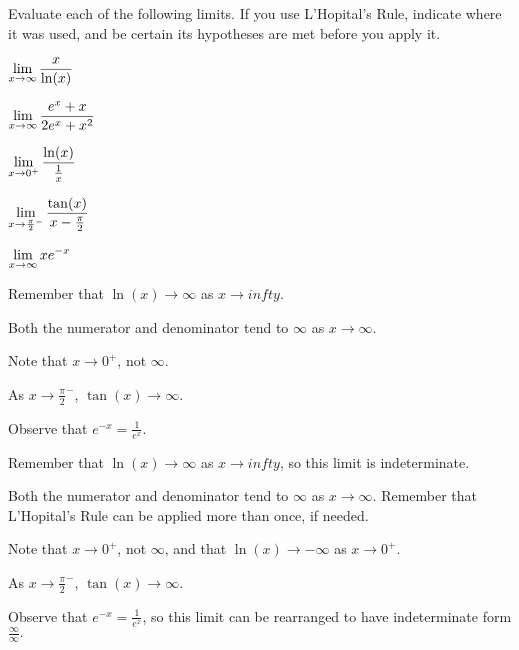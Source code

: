 \begin{activity} \label{A:2.8.3}  
Evaluate each of the following limits.  If you use L'Hopital's Rule, indicate where it was used, and be certain its hypotheses are met before you apply it.
\ba
  \item $\displaystyle \lim_{x \to \infty} \frac{x}{\ln(x)}$  
  \item $\displaystyle \lim_{x \to \infty} \frac{e^{x} + x}{2e^{x} + x^2}$ 
  \item $\displaystyle \lim_{x \to 0^+} \frac{\ln(x)}{\frac{1}{x}}$  
  \item $\displaystyle \lim_{x \to \frac{\pi}{2}^-} \frac{\tan(x)}{x-\frac{\pi}{2}}$
  \item $\displaystyle \lim_{x \to \infty} xe^{-x}$
\ea
\end{activity}
\begin{smallhint}
\ba
	\item Remember that $\ln(x) \to \infty$ as $x \to infty$.
	\item Both the numerator and denominator tend to $\infty$ as $x \to \infty$.
	\item Note that $x \to 0^+$, not $\infty$.
	\item As $x \to \frac{\pi}{2}^-$, $\tan(x) \to \infty$.
	\item Observe that $e^{-x} = \frac{1}{e^x}$.
\ea
\end{smallhint}
\begin{bighint}
\ba
	\item Remember that $\ln(x) \to \infty$ as $x \to infty$, so this limit is indeterminate.
	\item Both the numerator and denominator tend to $\infty$ as $x \to \infty$.  Remember that L'Hopital's Rule can be applied more than once, if needed.
	\item Note that $x \to 0^+$, not $\infty$, and that $\ln(x) \to -\infty$ as $x \to 0^+$.
	\item As $x \to \frac{\pi}{2}^-$, $\tan(x) \to \infty$.  
	\item Observe that $e^{-x} = \frac{1}{e^x}$, so this limit can be rearranged to have indeterminate form $\frac{\infty}{\infty}.$
\ea
\end{bighint}

